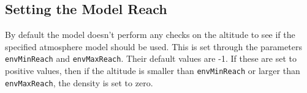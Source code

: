 \subsection{Setting the Model Reach}
By default the model doesn't perform any checks on the altitude to see if the specified atmosphere model should be used.  This is set through the parameters {\tt envMinReach} and {\tt envMaxReach}.  Their default values are -1.  If these are set to positive values, then if the altitude is smaller than {\tt envMinReach} or larger than {\tt envMaxReach}, the density is set to zero.

